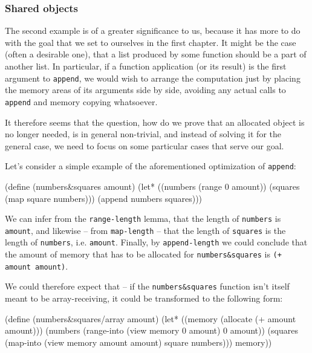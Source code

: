 \subsubsection{Shared objects}

The second example is of a greater significance to us, because it
has more to do with the goal that we set to ourselves in the first
chapter. It might be the case (often a desirable one), that a list
produced by some function should be a part of another list. In particular,
if a function application (or its result) is the first argument to
\texttt{append}, we would wish to arrange the computation just by placing
the memory areas of its arguments side by side, avoiding any actual
calls to \texttt{append} and memory copying whatsoever.

It therefore seems that the question, how do we prove that an allocated
object is no longer needed, is in general non-trivial, and instead of
solving it for the general case, we need to focus on some particular
cases that serve our goal.

Let's consider a simple example of the aforementioned optimization
of \texttt{append}:


\begin{Snippet}
  (define (numbers&squares amount)
    (let* ((numbers (range 0 amount))
           (squares (map square numbers)))
      (append numbers squares)))
\end{Snippet}

We can infer from the \texttt{range-length} lemma, that the length of
\texttt{numbers} is \texttt{amount}, and likewise -- from \texttt{map-length}
-- that the length of \texttt{squares} is the length of \texttt{numbers}, i.e.
\texttt{amount}. Finally, by \texttt{append-length} we could conclude that
the amount of memory that has to be allocated for \texttt{numbers\&squares}
is \texttt{(+ amount amount)}.

We could therefore expect that -- if the \texttt{numbers\&squares} function
isn't itself meant to be array-receiving, it could be transformed to the
following form\label{numbers-and-squares-array}:

\begin{Snippet}
  (define (numbers&squares/array amount)
    (let* ((memory (allocate (+ amount amount)))
           (numbers (range-into (view memory 0 amount)
                                0 amount))
           (squares (map-into (view memory amount amount)
                              square numbers)))
        memory))
\end{Snippet}
  
